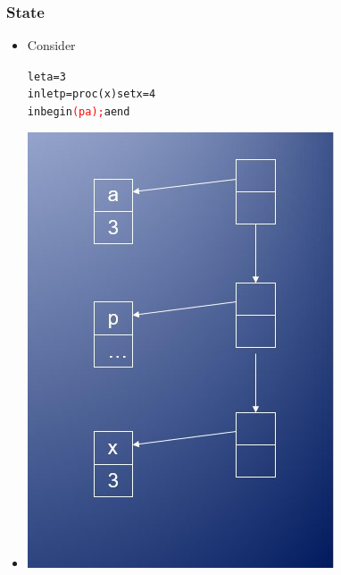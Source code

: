 \documentclass{beamer}
\begin{document}
\begin{frame}[fragile]
\frametitle{State}
\begin{scriptsize}
\begin{itemize}
\item<1-> Consider
\begin{alltt}
let a = 3
in let p = proc (x) set x = 4
   in begin \textcolor{red}{(p a);} a end
\end{alltt}

\item<1->
\begin{center}
\includegraphics[scale=0.5]{cbv3.jpg}
\end{center}

\end{itemize}
\end{scriptsize}
\end{frame}
\end{document}
